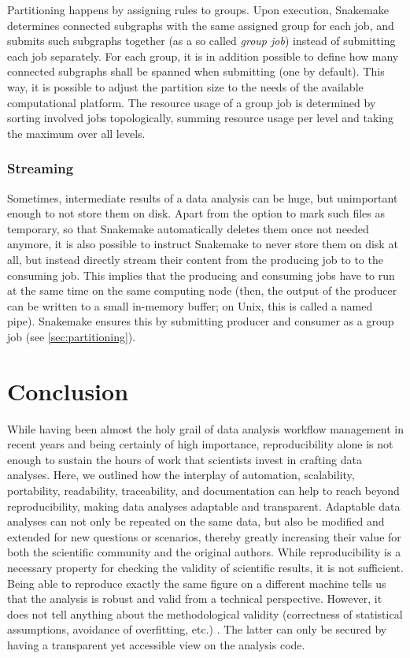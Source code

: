 \documentclass[parskip=half]{scrartcl}
\begin{document}
Partitioning happens by assigning rules to groups.
Upon execution, Snakemake determines connected subgraphs with the same assigned group for each job, and submits such subgraphs together (as a so called \emph{group job}) instead of submitting each job separately.
For each group, it is in addition possible to define how many connected subgraphs shall be spanned when submitting (one by default).
This way, it is possible to adjust the partition size to the needs of the available computational platform.
The resource usage of a group job is determined by sorting involved jobs topologically, summing resource usage per level and taking the maximum over all levels.

\subsubsection{Streaming}

Sometimes, intermediate results of a data analysis can be huge, but unimportant enough to not store them on disk.
Apart from the option to mark such files as temporary, so that Snakemake automatically deletes them once not needed anymore, it is also possible to instruct Snakemake to never store them on disk at all, but instead directly stream their content from the producing job to to the consuming job.
This implies that the producing and consuming jobs have to run at the same time on the same computing node (then, the output of the producer can be written to a small in-memory buffer; on Unix, this is called a named pipe).
Snakemake ensures this by submitting producer and consumer as a group job (see \autoref{sec:partitioning}).

\section{Conclusion}

While having been almost the holy grail of data analysis workflow management in recent years and being certainly of high importance, reproducibility alone is not enough to sustain the hours of work that scientists invest in crafting data analyses.
Here, we outlined how the interplay of automation, scalability, portability, readability, traceability, and documentation can help to reach beyond reproducibility, making data analyses adaptable and transparent.
Adaptable data analyses can not only be repeated on the same data, but also be modified and extended for new questions or scenarios, thereby greatly increasing their value for both the scientific community and the original authors.
While reproducibility is a necessary property for checking the validity of scientific results, it is not sufficient.
Being able to reproduce exactly the same figure on a different machine tells us that the analysis is robust and valid from a technical perspective.
However, it does not tell anything about the methodological validity (correctness of statistical assumptions, avoidance of overfitting, etc.)
.
The latter can only be secured by having a transparent yet accessible view on the analysis code.
\end{document}

